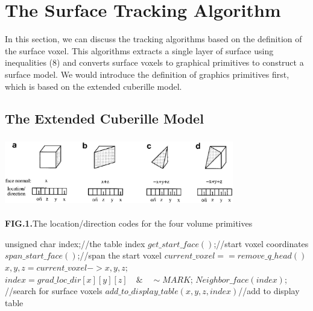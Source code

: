 \documentclass{article}
\begin{document}
\section{The Surface Tracking Algorithm}
In this section, we can discuss the tracking algorithms based on the definition
of the surface voxel. This algorithms extracts a single layer of surface using
inequalities (8) and converts surface voxels to graphical primitives to
construct a surface model. We would introduce the definition of graphics
primitives first, which is based on the extended cuberille model.

\subsection{The Extended Cuberille Model}

\centerline{\includegraphics[height=3cm,width=10cm]{tt.eps}}
\centerline{\textbf{FIG.1.}The location/direction codes for the four volume primitives}
\begin{codebox}
  \li unsigned char index;\qquad //the table index
  \li $get\_start\_face()$;\qquad //start voxel coordinates
  \li $span\_start\_face()$;\qquad //span the start voxel
  \li \While $current\_voxel == remove\_q\_head()$
  \li \Do
  \li $x,y,z = current\_voxel->x,y,z;$
  \li $index = grad\_loc\_dir[x][y][z] \quad \& \quad \sim MARK$;
  \li $Neighbor\_face(index)$; \qquad //search for surface voxels
  \li $add\_to\_display\_table(x,y,z,index)$\qquad //add to display table
  \End
\end{codebox}
\end{document}
